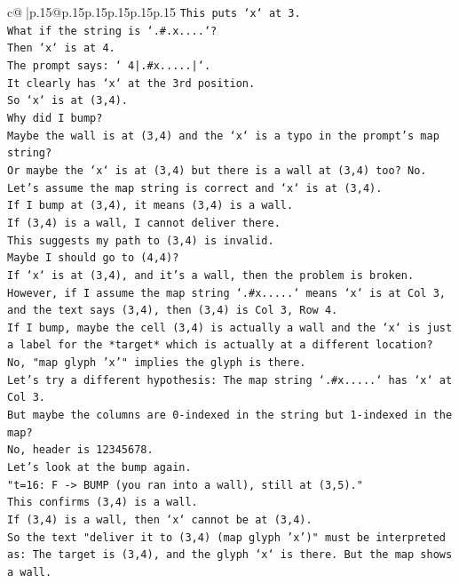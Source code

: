\documentclass{article}
\begin{document}
{\begin{supertabular}{c@{$\;$}|p{.15\linewidth}@{}p{.15\linewidth}p{.15\linewidth}p{.15\linewidth}p{.15\linewidth}p{.15\linewidth}}
{{{\texttt{This puts `x` at 3.} \\
\texttt{What if the string is `.\#.x....`?} \\
\texttt{Then `x` is at 4.} \\
\texttt{The prompt says: ` 4|.\#x.....|`.} \\
\texttt{It clearly has `x` at the 3rd position.} \\
\texttt{So `x` is at (3,4).} \\
\texttt{Why did I bump?} \\
\texttt{Maybe the wall is at (3,4) and the `x` is a typo in the prompt's map string?} \\
\texttt{Or maybe the `x` is at (3,4) but there is a wall at (3,4) too? No.} \\
\texttt{Let's assume the map string is correct and `x` is at (3,4).} \\
\texttt{If I bump at (3,4), it means (3,4) is a wall.} \\
\texttt{If (3,4) is a wall, I cannot deliver there.} \\
\texttt{This suggests my path to (3,4) is invalid.} \\
\texttt{Maybe I should go to (4,4)?} \\
\texttt{If `x` is at (3,4), and it's a wall, then the problem is broken.} \\
\texttt{However, if I assume the map string `.\#x.....` means `x` is at Col 3, and the text says (3,4), then (3,4) is Col 3, Row 4.} \\
\texttt{If I bump, maybe the cell (3,4) is actually a wall and the `x` is just a label for the *target* which is actually at a different location?} \\
\texttt{No, "map glyph 'x'" implies the glyph is there.} \\
\texttt{Let's try a different hypothesis: The map string `.\#x.....` has `x` at Col 3.} \\
\texttt{But maybe the columns are 0{-}indexed in the string but 1{-}indexed in the map?} \\
\texttt{No, header is 12345678.} \\
\texttt{Let's look at the bump again.} \\
\texttt{"t=16: F {-}> BUMP (you ran into a wall), still at (3,5)."} \\
\texttt{This confirms (3,4) is a wall.} \\
\texttt{If (3,4) is a wall, then `x` cannot be at (3,4).} \\
\texttt{So the text "deliver it to (3,4) (map glyph 'x')" must be interpreted as: The target is (3,4), and the glyph `x` is there. But the map shows a wall.} \\
}}}
\end{supertabular}}
\end{document}
